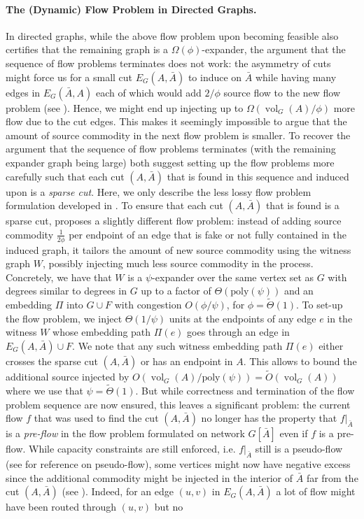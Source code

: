 \documentclass[11pt]{article}
\newcommand\ff{\boldsymbol{\mathit{f}}}
\DeclareMathOperator{\vol}{vol}
\begin{document}
\paragraph{The (Dynamic) Flow Problem in Directed Graphs.} In directed graphs, while the above flow problem upon becoming feasible also certifies that the remaining graph is a $\Omega(\phi)$-expander, the argument that the sequence of flow problems terminates does not work: the asymmetry of cuts might force us for a small cut $E_G(A, \bar{A})$ to induce on $\bar{A}$ while having many edges in $E_G(\bar{A}, A)$ each of which would add $2/\phi$ source flow to the new flow problem (see ). Hence, we might end up injecting up to $\Omega(\vol_G(A)/\phi)$ more flow due to the cut edges. This makes it seemingly impossible to argue that the amount of source commodity in the next flow problem is smaller. To recover the argument that the sequence of flow problems terminates (with the remaining expander graph being large) both \cite{bernstein2020deterministic, hua2023maintaining} suggest setting up the flow problems more carefully such that each cut $(A, \bar{A})$ that is found in this sequence and induced upon is a \emph{sparse cut}. Here, we only describe the less lossy flow problem formulation developed in \cite{hua2023maintaining}. To ensure that each cut $(A, \bar{A})$ that is found is a sparse cut, \cite{hua2023maintaining} proposes a slightly different flow problem: instead of adding source commodity $\frac{1}{2\phi}$ per endpoint of an edge that is fake or not fully contained in the induced graph, it tailors the amount of new source commodity using the witness graph $W$, possibly injecting much less source commodity in the process. Concretely, we have that $W$ is a $\psi$-expander over the same vertex set as $G$ with degrees similar to degrees in $G$ up to a factor of $\Theta(\text{poly}(\psi))$ and an embedding $\Pi$ into $G \cup F$ with congestion $O(\phi/\psi)$, for $\phi = \tilde{\Theta}(1)$. To set-up the flow problem, we inject $\Theta(1/\psi)$ units at the endpoints of any edge $e$ in the witness $W$ whose embedding path $\Pi(e)$ goes through an edge in $E_G(A, \bar{A}) \cup F$. We note that any such witness embedding path $\Pi(e)$ either crosses the sparse cut $(A, \bar{A})$ or has an endpoint in $A$. This allows to bound the additional source injected by $O(\vol_G(A)/\text{poly}(\psi)) = \tilde{O}(\vol_G(A))$ where we use that $\psi = \tilde{\Theta}(1)$. But while correctness and termination of the flow problem sequence are now ensured, this leaves a significant problem: the current flow $\ff$ that was used to find the cut $(A, \bar{A})$ no longer has the property that $\ff|_{\bar{A}}$ is a \emph{pre-flow} in the flow problem formulated on network $G[\bar{A}]$ even if $\ff$ is a pre-flow. While capacity constraints are still enforced, i.e. $\ff|_{\bar{A}}$ still is a pseudo-flow (see \cite{hochbaum2008pseudoflow} for reference on pseudo-flow), some vertices might now have negative excess since the additional commodity might be injected in the interior of $\bar{A}$ far from the cut $(A, \bar{A})$ (see ). Indeed, for an edge $(u,v)$ in $E_G(A, \bar{A})$ a lot of flow might have been routed through $(u,v)$ but no 
\end{document}
